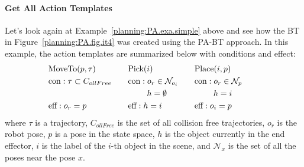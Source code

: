 \paragraph*{\textbf{Get All Action Templates}\\}
Let's look again at Example~\ref{planning:PA.exa.simple} above and see how the BT in Figure~\ref{planning:PA.fig.it4} was created using the PA-BT approach. In this example, the action templates are summarized below with conditions and effect:
\begin{equation*}
\begin{aligned}
&\mbox{MoveTo}(p,\tau)   \\   
&\mbox{con}:\tau \subset C_{ollFree} \hspace{2em}  \\ 
& \\ 
&\mbox{eff}:o_r = p
\end{aligned}
\begin{aligned}
&\mbox{Pick}(i)   \\   
&\mbox{con}: o_r \in \mathcal{N}_{o_i} \hspace{2em} \\ 
	 &\hspace{2.3em}h  =  \emptyset \\	  
&\mbox{eff}: h = i \hspace{1em} 
\end{aligned}
\begin{aligned}
&\mbox{Place}(i,p)   \\   
&\mbox{con}: o_r \in \mathcal{N}_{p} \hspace{2em}  \\ 
	 &\hspace{2.3em}h = i  \\	  
&\mbox{eff}: o_i = p \hspace{1em} 
\end{aligned}
\end{equation*}
where $\tau$ is a trajectory, $C_{ollFree}$ is the set of all collision free trajectories,  $o_r$ is the robot pose, $p$ is a pose in the state space, $h$ is the object currently in the end effector, $i$ is the label of the $i$-th object in the scene, and  $\mathcal{N}_{x}$ is the set of all the poses near the pose $x$. %



